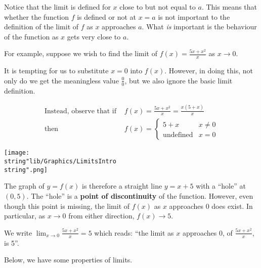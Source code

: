 \documentclass[11pt,a4paper]{book}
\begin{document}
Notice that the limit is defined for $x$ close to but not equal to
$a$. This means that whether the function $f$ is defined or not
at $x=a$ is not important to the definition of the limit of $f$
as $x$ approaches $a$. What \textit{is} important is the behaviour
of the function as $x$ gets very close to $a$.

For example, suppose we wish to find the limit of ${\displaystyle f\left(x\right)=\frac{5x+x^{2}}{x}}$
as $x\rightarrow0$.

It is tempting for us to substitute $x=0$ into $f\left(x\right)$.
However, in doing this, not only do we get the meaningless value $\frac{0}{0}$, but we also ignore the basic limit definition.

\begin{minipage}{.5\textwidth}

\begin{align*}
{\displaystyle \text{Instead, observe that if }} & f\left(x\right)=\frac{5x+x^{2}}{x}=\frac{x\left(5+x\right)}{x}\\
\text{then } & f\left(x\right)=\begin{cases}
5+x & x\neq0\\
\text{undefined} & x=0
\end{cases}
\end{align*}

\end{minipage}
\begin{minipage}{.5\textwidth}
\begin{center}
\texttt{[image: \\string"lib/Graphics/LimitsIntro\\string".png]}
\par\end{center}

\end{minipage}

The graph of $y=f\left(x\right)$ is therefore a straight line $y=x+5$
with a ``hole'' at $\left(0,5\right)$. The ``hole'' is a \textbf{point
of discontinuity} of the function.
However, even though this point is missing, the limit of $f\left(x\right)$
as $x$ approaches $0$ does exist. In particular, as $x\to0$ from
either direction, $f\left(x\right)\rightarrow5$.

We write ${\displaystyle \lim_{x\to0}\frac{5x+x^{2}}{x}=5}$ which
reads: ``the limit as $x$ approaches 0, of  ${\displaystyle \frac{5x+x^{2}}{x}}$, is 5''.

Below, we have some properties of limits.
\end{document}
